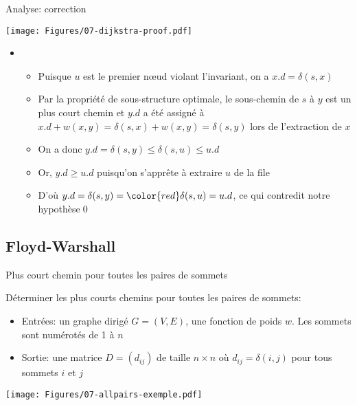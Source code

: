 \begin{frame}{Analyse: correction}

\centerline{\texttt{[image: Figures/07-dijkstra-proof.pdf]}}

\begin{itemize}
\item[]
\begin{itemize}
\item Puisque $u$ est le premier n\oe ud violant l'invariant, on a $x.d=\delta(s,x)$
\item Par la propriété de sous-structure optimale, le sous-chemin de $s$ à $y$ est un plus court chemin et $y.d$ a été assigné à $x.d+w(x,y)=\delta(s,x)+w(x,y)=\delta(s,y)$ lors de l'extraction de $x$
\item On a donc $y.d=\delta(s,y)\leq \delta(s,u)\leq u.d$
\item Or, $y.d\geq u.d$ puisqu'on s'apprête à extraire $u$ de la file
\item D'où $y.d=\delta(s,y)={\color{red}\delta(s,u)=u.d}$, ce qui contredit notre hypothèse\qed
\end{itemize}
\end{itemize}

\end{frame}

\subsection{Floyd-Warshall}

\begin{frame}{Plus court chemin pour toutes les paires de sommets}

Déterminer les plus courts chemins pour toutes les paires de sommets:
\begin{itemize}
\item Entrées: un graphe dirigé $G=(V,E)$, une fonction de poids $w$. Les sommets sont numérotés de 1 à $n$
\item Sortie: une matrice $D=(d_{ij})$ de taille $n\times n$ où $d_{ij}=\delta(i,j)$ pour tous sommets $i$ et $j$
\end{itemize}

\bigskip

\centerline{\texttt{[image: Figures/07-allpairs-exemple.pdf]}}

\end{frame}

